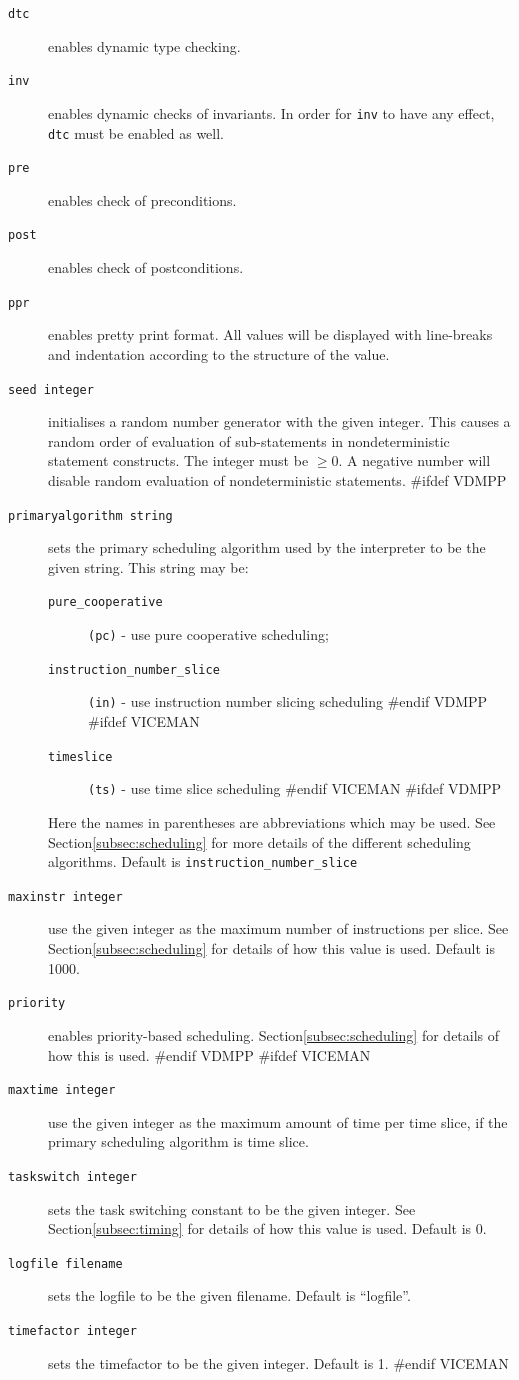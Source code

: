 \documentclass[\pformat,12pt]{article}
\begin{document}
\begin{description}
  \begin{description}
  \item[{\tt dtc}] enables dynamic type checking.
  \item[{\tt inv}] enables dynamic checks of invariants. In order for
    {\tt inv} to have any effect, {\tt dtc} must be enabled as well.
  \item[{\tt pre}] enables check of preconditions.
  \item[{\tt post}] enables check of postconditions.
  \item[{\tt ppr}] enables pretty print format. All values will be
    displayed with line-breaks and indentation according to the
    structure of the value.
  \item[{\tt seed integer}] initialises a random number generator with
    the given integer.  This causes a random order of evaluation of
    sub-statements in nondeterministic statement constructs.  The
    integer must be $\geq 0$. A negative number will disable random
    evaluation of nondeterministic statements.
#ifdef VDMPP
  \item[{\tt primaryalgorithm string}] sets the primary scheduling
    algorithm used by the interpreter to be the given string. This
    string may be:
    \begin{description}
    \item[{\tt pure\_cooperative}] \texttt{(pc)} - use pure
      cooperative scheduling;
    \item[{\tt instruction\_number\_slice}] \texttt{(in)} - use
      instruction number slicing scheduling
#endif VDMPP
#ifdef VICEMAN
    \item[{\tt timeslice}] \texttt{(ts)} - use time slice scheduling 
#endif VICEMAN
#ifdef VDMPP
    \end{description}
    Here the names in parentheses are abbreviations which may be
    used. See Section\ref{subsec:scheduling} for more details of the
    different scheduling algorithms. Default is 
    {\tt instruction\_number\_slice}
  \item[{\tt maxinstr integer}] use the given integer as the maximum
    number of instructions per slice. See
    Section\ref{subsec:scheduling} for details of how this value is
    used. Default is 1000.
  \item[{\tt priority}] enables priority-based scheduling.
    Section\ref{subsec:scheduling} for details of how this is
    used. 
#endif VDMPP
#ifdef VICEMAN
  \item[{\tt maxtime integer}] use the given integer as the maximum
    amount of time per time slice, if the primary scheduling algorithm
    is time slice.
  \item[{\tt taskswitch integer}] sets the task switching constant to
    be the given integer. See Section\ref{subsec:timing} for details
    of how this value is used. Default is 0.
  \item[{\tt logfile filename}] sets the logfile to be the given
    filename. Default is ``logfile''.
  \item[{\tt timefactor integer}] sets the timefactor to be the given
    integer. Default is 1.
#endif VICEMAN
  \end{description}
  

\end{description}
\end{document}

